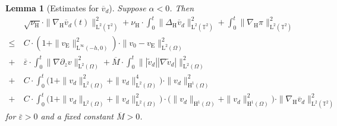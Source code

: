 \documentclass[preprint]{elsarticle}
\newtheorem{lem}[lem]{Lemma}
\numberwithin{equation}{section}
\newcommand {\T}	{\mathbb{T}}
\renewcommand{\H}{\mathrm{H}}
\renewcommand{\bar}[1]{\overline{#1}}
\newcommand{\vbar}{\bar{v}}
\newcommand{\vtilde}{\tilde{v}}
\newcommand{\nablaH}{\nabla_{\H}}
\newcommand{\DeltaH}{\Delta_{\H}}
\newcommand{\rL}{\mathrm{L}}
\newcommand{\rH}{\H}
\newcommand{\rE}{\mathrm{E}}
\begin{document}
\begin{lem}[Estimates for $\bar{v}_d$]\label{lem:estimate vbar_2}
	Suppose $\alpha < 0$. %
	Then 
	\begin{equation*}
		\begin{aligned}
			&\sqrt{\nu_{\rH}}\cdot \| \nablaH \vbar_d(t) \|_{\rL^2(\T^2)}^2
			+ \nu_{\rH} \cdot \int_0^t \| \DeltaH \vbar_d \|_{\rL^2(\T^2)}^2
			+ \int_0^t \| \nablaH \pi \|_{\rL^2(\T^2)}^2 \\ 
			\leq \ &
			C \cdot (1 + \| v_{\rE} \|_{\rL^\infty(-h,0)}^2) \cdot \| v_0 - v_{\rE} \|_{\rL^2(\Omega)}^2 \\
			+ \ &
			\bar{\varepsilon} \cdot \int_0^t \| \nabla \partial_z v \|_{\rL^2(\Omega)}^2
			+ \bar{M} \cdot \int_0^t \| |\vtilde_d| |\nabla\vtilde_d| \|_{\rL^2(\Omega)}^2 \\
			+ \ &C \cdot \int_0^t \bigl( 1+ \| v_d \|_{\rL^2(\Omega)}^2 + \| v_d \|_{\rL^2(\Omega)}^4 \bigr) \cdot \| v_d \|_{\rH^1(\Omega)}^2 \\
			+ \ &C \cdot \int_0^t \bigl( 1+ \| v_d \|_{\rL^2(\Omega)} + \| v_d \|_{\rL^2(\Omega)}^2 \bigr) \cdot \bigl( \| v_d \|_{\rH^1(\Omega)}+\| v_d \|_{\rH^1(\Omega)}^2 \bigr) \cdot \| \nablaH \vbar_d \|_{\rL^2(\T^2)}^2 
		\end{aligned}
	\end{equation*}
	for $\bar{\varepsilon} > 0$ and a fixed constant $\bar{M} > 0$.
\end{lem}
\end{document}
